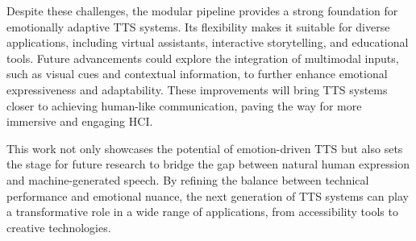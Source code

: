 Despite these challenges, the modular pipeline provides a strong foundation for emotionally adaptive TTS systems. Its flexibility makes it suitable for diverse applications, including virtual assistants, interactive storytelling, and educational tools. Future advancements could explore the integration of multimodal inputs, such as visual cues and contextual information, to further enhance emotional expressiveness and adaptability. These improvements will bring TTS systems closer to achieving human-like communication, paving the way for more immersive and engaging HCI.

This work not only showcases the potential of emotion-driven TTS but also sets the stage for future research to bridge the gap between natural human expression and machine-generated speech. By refining the balance between technical performance and emotional nuance, the next generation of TTS systems can play a transformative role in a wide range of applications, from accessibility tools to creative technologies.

